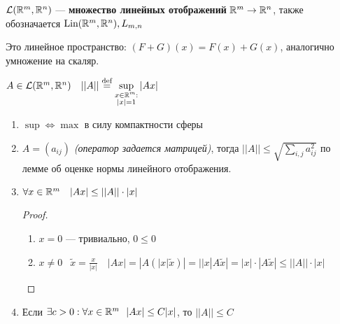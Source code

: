 \begin{definition}
    $\mathcal L(\mathbb{R}^m, \mathbb{R}^n)$ --- \textbf{множество линейных отображений} $\mathbb{R}^m \to \mathbb{R}^n$, также обозначается $\text{Lin}(\mathbb{R}^m, \mathbb{R}^n), L_{m, n}$

    Это линейное пространство: $(F+G)(x)=F(x)+G(x)$, аналогично умножение на скаляр.
\end{definition}

\begin{obozn}
    $A\in \mathcal L(\mathbb{R}^m, \mathbb{R}^n) \quad ||A|| \stackrel{\text{def}}{=} \sup\limits_{\substack{x\in\mathbb{R}^m :\\ |x|=1}} |Ax|$
\end{obozn}

\begin{remark}
    \itemfix
    \begin{enumerate}
        \item $\sup \Leftrightarrow \max$ в силу компактности сферы
        \item $A = (a_{ij})$ \textit{(оператор задается матрицей)}, тогда $||A||\le \sqrt{\sum\limits_{i, j} a_{ij}^2}$ по лемме об оценке нормы линейного отображения.
        \item $\forall x \in \mathbb{R}^m \quad |Ax| \le ||A||\cdot |x|$
              \begin{proof}
                  \begin{enumerate}
                      \item $x=0$ --- тривиально, $0\le 0$
                      \item $x\not=0\ $ $\ \tilde x = \frac{x}{|x|} \quad |Ax| = |A(|x|\tilde x)| = ||x| A\tilde x| = |x|\cdot |A\tilde x| \le ||A||\cdot |x|$
                  \end{enumerate}
              \end{proof}
        \item Если $\exists c > 0 : \forall x\in\mathbb{R}^m \ \ |Ax|\le C|x|$, то $||A||\le C$
    \end{enumerate}
\end{remark}

